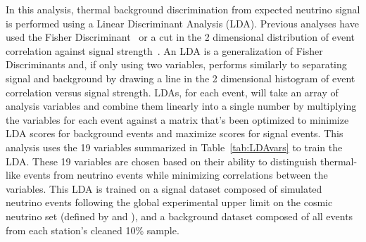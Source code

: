   In this analysis, thermal background discrimination from expected neutrino signal is performed using a Linear Discriminant Analysis (LDA).
  Previous analyses have used the Fisher Discriminant~\citep{fisherDiscriminant, ara_pa_analysis} or a cut in the 2 dimensional distribution of event correlation against signal strength~\citep{ara_a23}. 
  An LDA is a generalization of Fisher Discriminants and, if only using two variables, performs similarly to separating signal and background by drawing a line in the 2 dimensional histogram of event correlation versus signal strength. 
  LDAs, for each event, will take an array of analysis variables and combine them linearly into a single number by multiplying the variables for each event against a matrix that's been optimized to minimize LDA scores for background events and maximize scores for signal events. 
  This analysis uses the 19 variables summarized in Table~\ref{tab:LDAvars} to train the LDA. 
  These 19 variables are chosen based on their ability to distinguish thermal-like events from neutrino events while minimizing correlations between the variables.
  This LDA is trained on a signal dataset composed of simulated neutrino events following the global experimental upper limit on the cosmic neutrino set (defined by \citep{icecube_search-ehe} and \citep{anita_iv}), and a background dataset composed of all events from each station's cleaned 10\% sample.   
  
